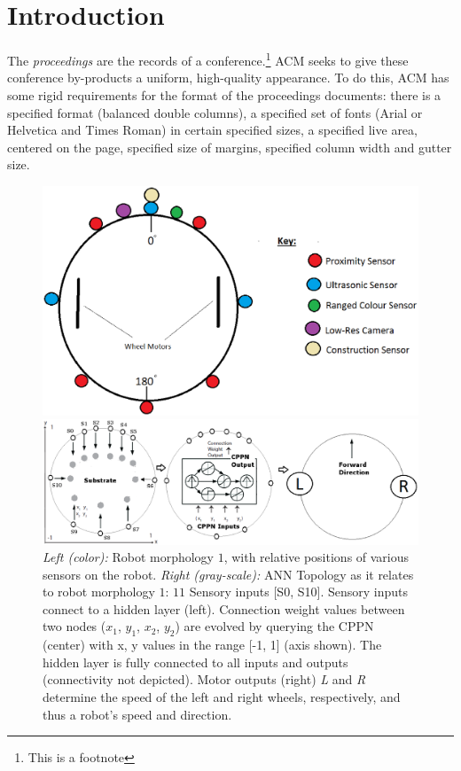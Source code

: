 \section{Introduction}

The \textit{proceedings} are the records of a conference.\footnote{This
  is a footnote}  ACM seeks
to give these conference by-products a uniform, high-quality
appearance.  To do this, ACM has some rigid requirements for the
format of the proceedings documents: there is a specified format
(balanced double columns), a specified set of fonts (Arial or
Helvetica and Times Roman) in certain specified sizes, a specified
live area, centered on the page, specified size of margins, specified
column width and gutter size.

\begin{figure}[t]
	\centering
	\begin{minipage}{0.39\textwidth}
		\centering
		\includegraphics[width=\textwidth]{Morphology.eps}
	\end{minipage}
	\centering
	\begin{minipage}{0.60\textwidth}
		\centering
		\includegraphics[width=\textwidth]{ANN_Config3.eps}
	\end{minipage}
	\caption{\textit{Left (color):} Robot morphology $1$, with relative positions of various sensors on the robot.
		\textit{Right (gray-scale):} ANN Topology as it relates to robot morphology $1$: $11$ Sensory inputs [S0, S10].  Sensory inputs connect to a hidden
		layer (left).  Connection weight values between two nodes ($x_{1}$, $y_{1}$, $x_{2}$, $y_{2}$) are evolved by querying the CPPN (center) with x, y
		values in the range [-1, 1] (axis shown).  The hidden layer is fully connected to all inputs and outputs (connectivity not depicted).
		Motor outputs (right)
		\textit{L} and \textit{R} determine the speed of the left and right wheels, respectively, and thus a robot's speed and direction.}\label{fig:ann}
\end{figure}

